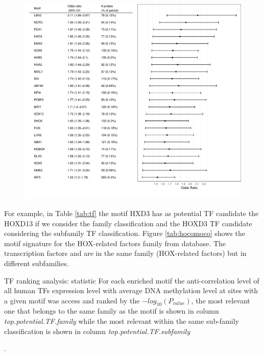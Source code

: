 \begin{center}
\begin{figure}[h!]
\includegraphics[width=16cm]{images/hyper_motif_enrichment.pdf}
\begin{flushleft}
\end{flushleft}
\end{figure}
\label{tab:or}
\end{center}


For example, in Table \ref{tab:tf} the motif HXD3 has as potential TF candidate the HOXD13 if we consider the family  classification and the HOXD3 TF candidate considering the subfamily TF classification. Figure \ref{tab:hocomoco} shows the motif signature for the HOX-related factors family from  database. The transcription factors  and  are in the same family (HOX-related factors) but in different subfamilies.



\begin{table}[h!]
\centering
\caption{TF ranking analysis: statistic For each enriched motif the anti-correlation level of all human TFs expression level with average DNA methylation level at sites with a given motif was access and ranked by the $-log_{10}(P_{value})$, the most relevant one that belongs to the same family as the motif is shown in column \textit{top.potential.TF.family} while the most relevant within the same sub-family classification is shown in column \textit{top.potential.TF.subfamily}}.
\label{tab:tf}
\end{table}

